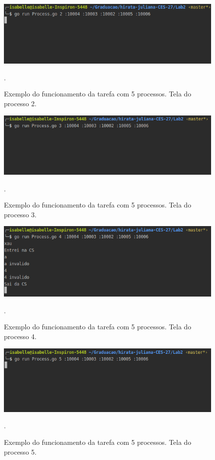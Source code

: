 \documentclass[conference]{IEEEtran}
\begin{document}
\begin{figure}[H]
\centering
\centerline{\includegraphics[scale=0.4]{imagens/ex2-proc2-clean.png}}
\caption{Exemplo do funcionamento da tarefa com 5 processos. Tela do processo 2.}.
\label{ex2-proc2-clean}
\end{figure}

\begin{figure}[H]
\centering
\centerline{\includegraphics[scale=0.4]{imagens/ex2-proc3-clean.png}}
\caption{Exemplo do funcionamento da tarefa com 5 processos. Tela do processo 3.}.
\label{ex2-proc3-clean}
\end{figure}

\begin{figure}[H]
\centering
\centerline{\includegraphics[scale=0.4]{imagens/ex2-proc4-clean.png}}
\caption{Exemplo do funcionamento da tarefa com 5 processos. Tela do processo 4.}.
\label{ex2-proc4-clean}
\end{figure}

\begin{figure}[H]
\centering
\centerline{\includegraphics[scale=0.4]{imagens/ex2-proc5-clean.png}}
\caption{Exemplo do funcionamento da tarefa com 5 processos. Tela do processo 5.}.
\label{ex2-proc5-clean}
\end{figure}
\end{document}
